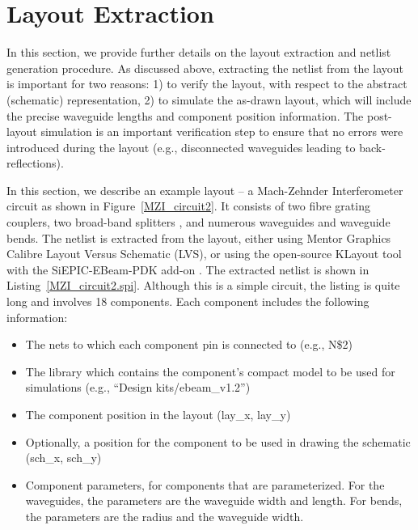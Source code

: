 \documentclass[journal]{spie}
\begin{document}
\section{Layout Extraction}

In this section, we provide further details on the layout extraction and netlist generation procedure.  
As discussed above, extracting the netlist from the layout is important for two reasons: 1) to verify the layout, with respect to the abstract (schematic) representation, 2) to simulate the as-drawn layout, which will include the precise waveguide lengths and component position information.  The post-layout simulation is an important verification step to ensure that no errors were introduced during the layout (e.g., disconnected waveguides leading to back-reflections).

In this section, we describe an example layout -- a Mach-Zehnder Interferometer circuit as shown in Figure~\ref{MZI_circuit2}.  It consists of two fibre grating couplers, two broad-band splitters \cite{lu2015broadband}, and numerous waveguides and waveguide bends.  The netlist is extracted from the layout, either using Mentor Graphics Calibre Layout Versus Schematic (LVS), or using the open-source KLayout \cite{www_klayout} tool with the SiEPIC-EBeam-PDK add-on \cite{siepic-ebeam-pdk}.  The extracted netlist is shown in Listing~\ref{MZI_circuit2.spi}.  Although this is a simple circuit, the listing is quite long and involves 18 components.  
Each component includes the following information:
\begin{itemize}
\item The nets to which each component pin is connected to (e.g., N\$2)
\item The library which contains the component's compact model to be used for simulations (e.g., ``Design kits/ebeam\_v1.2'')
\item The component position in the layout (lay\_x, lay\_y)
\item Optionally, a position for the component to be used in drawing the schematic (sch\_x, sch\_y)
\item Component parameters, for components that are parameterized.  For the waveguides, the parameters are the waveguide width and length.    For bends, the parameters are the radius and the waveguide width.
\end{itemize}
\end{document}

